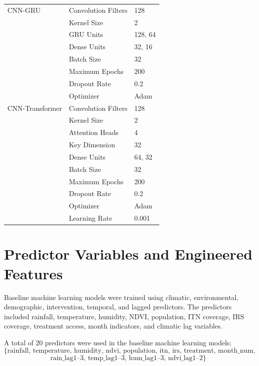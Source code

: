 \begin{table}[H]
\begin{tabular}{p{3cm}p{5cm}p{3cm}}
		CNN-GRU & Convolution Filters & 128 \\
		 & Kernel Size & 2 \\
	 & GRU Units & 128, 64 \\
	 & Dense Units & 32, 16 \\
	 & Batch Size & 32 \\
		& Maximum Epochs & 200 \\
	 & Dropout Rate & 0.2 \\
	& Optimizer & Adam \\
		\hline
		 \hline
		 
		 CNN-Transformer & Convolution Filters & 128 \\
		 & Kernel Size & 2 \\
		 & Attention Heads & 4 \\
		 & Key Dimension & 32 \\
		 & Dense Units & 64, 32 \\
		 & Batch Size & 32 \\
		 & Maximum Epochs & 200 \\
		 & Dropout Rate & 0.2 \\
		 & Optimizer & Adam \\
		 & Learning Rate & 0.001 \\
		 \hline
	\end{tabular}
\end{table}

\section{Predictor Variables and Engineered Features}

Baseline machine learning models were trained using climatic, environmental, demographic, intervention, temporal, and lagged predictors. The predictors included rainfall, temperature, humidity, NDVI, population, ITN coverage, IRS coverage, treatment access, month indicators, and climatic lag variables.

A total of 20 predictors were used in the baseline machine learning models:
\[
\{\text{rainfall, temperature, humidity, ndvi, population, itn, irs, treatment, month\_num,}
\]
\[
\text{rain\_lag1--3, temp\_lag1--3, hum\_lag1--3, ndvi\_lag1--2}\}
\]

